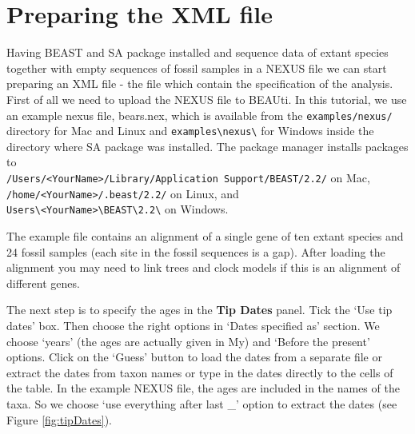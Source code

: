 \documentclass[12pt]{article}
\begin{document}
\section{Preparing the XML file}

Having BEAST and SA package installed and sequence data of extant species together with empty sequences of fossil samples in a NEXUS file we can start preparing an XML file - the file which contain the specification of the analysis. First of all we need to upload the NEXUS file to BEAUti. In this tutorial, we use an example nexus file, bears.nex, which is available from the {\tt examples/nexus/} directory for Mac and Linux and  {\tt examples\textbackslash nexus\textbackslash} for Windows inside the directory where SA package was installed. The package manager installs packages to \\
{\tt /Users/<YourName>/Library/Application Support/BEAST/2.2/} on Mac, \\
{\tt /home/<YourName>/.beast/2.2/} on Linux, and \\
{\tt Users\textbackslash<YourName>\textbackslash BEAST\textbackslash 2.2\textbackslash} on Windows.

The example file contains an alignment of a single gene of ten extant species and 24 fossil samples (each site in the fossil sequences is a gap).   
After loading the alignment you may need to link trees and clock models if this is an alignment of different genes. 

The next step is to specify the ages in the {\bf Tip Dates} panel. Tick the `Use tip dates' box. Then choose the right options in `Dates specified as' section. We choose `years' (the ages are actually given in My) and `Before the present' options.  Click on the `Guess' button to load the dates from a separate file or extract the dates from taxon names or type in the dates directly to the cells of the table.  In the example NEXUS file, the ages are included in the names of the taxa. So we choose `use everything after last \_' option to extract the dates (see Figure \ref{fig:tipDates}).
\end{document}
